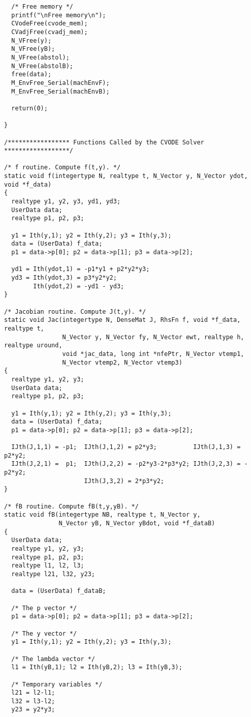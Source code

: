\begin{verbatim}
  /* Free memory */
  printf("\nFree memory\n");
  CVodeFree(cvode_mem);
  CVadjFree(cvadj_mem);
  N_VFree(y);
  N_VFree(yB);
  N_VFree(abstol);
  N_VFree(abstolB);
  free(data);
  M_EnvFree_Serial(machEnvF);
  M_EnvFree_Serial(machEnvB);

  return(0);

}

/***************** Functions Called by the CVODE Solver ******************/

/* f routine. Compute f(t,y). */
static void f(integertype N, realtype t, N_Vector y, N_Vector ydot, void *f_data)
{
  realtype y1, y2, y3, yd1, yd3;
  UserData data;
  realtype p1, p2, p3;

  y1 = Ith(y,1); y2 = Ith(y,2); y3 = Ith(y,3);
  data = (UserData) f_data;
  p1 = data->p[0]; p2 = data->p[1]; p3 = data->p[2];

  yd1 = Ith(ydot,1) = -p1*y1 + p2*y2*y3;
  yd3 = Ith(ydot,3) = p3*y2*y2;
        Ith(ydot,2) = -yd1 - yd3;
}

/* Jacobian routine. Compute J(t,y). */
static void Jac(integertype N, DenseMat J, RhsFn f, void *f_data, realtype t,
                N_Vector y, N_Vector fy, N_Vector ewt, realtype h, realtype uround,
                void *jac_data, long int *nfePtr, N_Vector vtemp1,
                N_Vector vtemp2, N_Vector vtemp3)
{
  realtype y1, y2, y3;
  UserData data;
  realtype p1, p2, p3;
 
  y1 = Ith(y,1); y2 = Ith(y,2); y3 = Ith(y,3);
  data = (UserData) f_data;
  p1 = data->p[0]; p2 = data->p[1]; p3 = data->p[2];
 
  IJth(J,1,1) = -p1;  IJth(J,1,2) = p2*y3;          IJth(J,1,3) = p2*y2;
  IJth(J,2,1) =  p1;  IJth(J,2,2) = -p2*y3-2*p3*y2; IJth(J,2,3) = -p2*y2;
                      IJth(J,3,2) = 2*p3*y2;
}
 
/* fB routine. Compute fB(t,y,yB). */
static void fB(integertype NB, realtype t, N_Vector y, 
               N_Vector yB, N_Vector yBdot, void *f_dataB)
{
  UserData data;
  realtype y1, y2, y3;
  realtype p1, p2, p3;
  realtype l1, l2, l3;
  realtype l21, l32, y23;
  
  data = (UserData) f_dataB;

  /* The p vector */
  p1 = data->p[0]; p2 = data->p[1]; p3 = data->p[2];

  /* The y vector */
  y1 = Ith(y,1); y2 = Ith(y,2); y3 = Ith(y,3);
  
  /* The lambda vector */
  l1 = Ith(yB,1); l2 = Ith(yB,2); l3 = Ith(yB,3);

  /* Temporary variables */
  l21 = l2-l1;
  l32 = l3-l2;
  y23 = y2*y3;


\end{verbatim}
